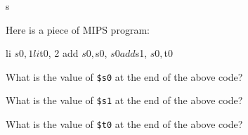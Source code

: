 s

\renewcommand\AUTHOR{aoro1@cougars.ccis.edu} %


\topmattertwo


Here is a piece of MIPS program:
\begin{console}
li     $s0, 1
li     $t0, 2
add    $s0, $s0, $s0
add    $s1, $s0, $t0
\end{console}


\nextq
What is the value of \verb!$s0! at the end of the above code?


\nextq
What is the value of \verb!$s1! at the end of the above code?


\nextq
What is the value of \verb!$t0! at the end of the above code?


\newpage


